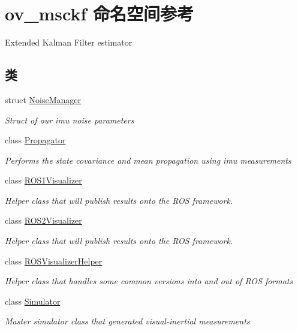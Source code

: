 \hypertarget{namespaceov__msckf}{}\section{ov\+\_\+msckf 命名空间参考}
\label{namespaceov__msckf}


Extended Kalman Filter estimator  


\subsection*{类}
\begin{DoxyCompactItemize}
\item 
struct \hyperlink{structov__msckf_1_1NoiseManager}{Noise\+Manager}
\begin{DoxyCompactList}\small\item\em Struct of our imu noise parameters \end{DoxyCompactList}\item 
class \hyperlink{classov__msckf_1_1Propagator}{Propagator}
\begin{DoxyCompactList}\small\item\em Performs the state covariance and mean propagation using imu measurements \end{DoxyCompactList}\item 
class \hyperlink{classov__msckf_1_1ROS1Visualizer}{R\+O\+S1\+Visualizer}
\begin{DoxyCompactList}\small\item\em Helper class that will publish results onto the R\+OS framework. \end{DoxyCompactList}\item 
class \hyperlink{classov__msckf_1_1ROS2Visualizer}{R\+O\+S2\+Visualizer}
\begin{DoxyCompactList}\small\item\em Helper class that will publish results onto the R\+OS framework. \end{DoxyCompactList}\item 
class \hyperlink{classov__msckf_1_1ROSVisualizerHelper}{R\+O\+S\+Visualizer\+Helper}
\begin{DoxyCompactList}\small\item\em Helper class that handles some common versions into and out of R\+OS formats \end{DoxyCompactList}\item 
class \hyperlink{classov__msckf_1_1Simulator}{Simulator}
\begin{DoxyCompactList}\small\item\em Master simulator class that generated visual-\/inertial measurements \end{DoxyCompactList}\item 

\end{DoxyCompactItemize}
